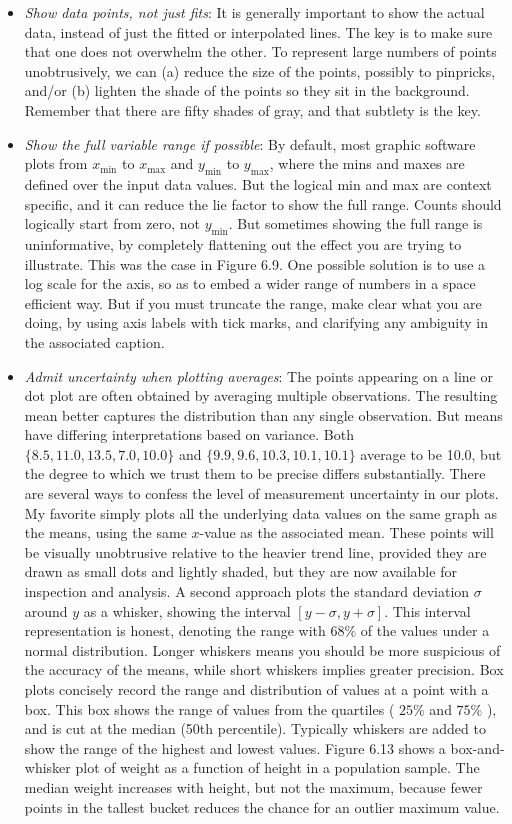 \documentclass[10pt]{article}
\begin{document}
\begin{itemize}
  \item \textit{Show data points, not just fits}: It is generally important to show the actual data, instead of just the fitted or interpolated lines. The key is to make sure that one does not overwhelm the other. To represent large numbers of points unobtrusively, we can (a) reduce the size of the points, possibly to pinpricks, and/or (b) lighten the shade of the points so they sit in the background. Remember that there are fifty shades of gray, and that subtlety is the key.
  \item \textit{Show the full variable range if possible}: By default, most graphic software plots from \( x_{\text{min}} \) to \( x_{\text{max}} \) and \( y_{\text{min}} \) to \( y_{\text{max}} \), where the mins and maxes are defined over the input data values. But the logical min and max are context specific, and it can reduce the lie factor to show the full range. Counts should logically start from zero, not \( y_{\text{min}} \). But sometimes showing the full range is uninformative, by completely flattening out the effect you are trying to illustrate. This was the case in Figure 6.9. One possible solution is to use a log scale for the axis, so as to embed a wider range of numbers in a space efficient way. But if you must truncate the range, make clear what you are doing, by using axis labels with tick marks, and clarifying any ambiguity in the associated caption.
  \item \textit{Admit uncertainty when plotting averages}: The points appearing on a line or dot plot are often obtained by averaging multiple observations. The resulting mean better captures the distribution than any single observation. But means have differing interpretations based on variance. Both \(\{8.5,11.0,13.5,7.0,10.0\}\) and \(\{9.9,9.6,10.3,10.1,10.1\}\) average to be 10.0, but the degree to which we trust them to be precise differs substantially. There are several ways to confess the level of measurement uncertainty in our plots. My favorite simply plots all the underlying data values on the same graph as the means, using the same \( x \)-value as the associated mean. These points will be visually unobtrusive relative to the heavier trend line, provided they are drawn as small dots and lightly shaded, but they are now available for inspection and analysis. A second approach plots the standard deviation \(\sigma\) around \( y \) as a whisker, showing the interval \([y-\sigma, y+\sigma]\). This interval representation is honest, denoting the range with \(68\%\) of the values under a normal distribution. Longer whiskers means you should be more suspicious of the accuracy of the means, while short whiskers implies greater precision. Box plots concisely record the range and distribution of values at a point with a box. This box shows the range of values from the quartiles ( \(25\%\) and \(75\%\) ), and is cut at the median (50th percentile). Typically whiskers are added to show the range of the highest and lowest values. Figure 6.13 shows a box-and-whisker plot of weight as a function of height in a population sample. The median weight increases with height, but not the maximum, because fewer points in the tallest bucket reduces the chance for an outlier maximum value.

\end{itemize}
\end{document}
